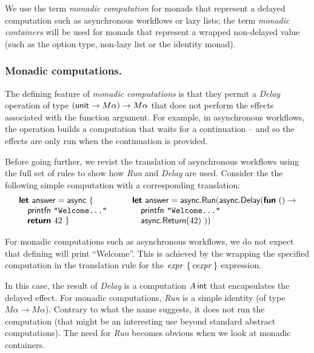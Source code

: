 \documentclass[runningheads,a4paper]{llncs}
\begin{document}
We use the term \emph{monadic computation} for monads that represent 
a delayed computation such as asynchronous workflows or lazy lists; the term 
\emph{monadic containers} will be used for monads that represent a wrapped non-delayed value
(such as the option type, non-lazy list or the identity monad).

\vspace{-1em}
\subsubsection{Monadic computations.} The defining feature of \emph{monadic computations}
is that they permit a \emph{Delay} operation of type $(\textnormal{\sffamily unit} \rightarrow M\alpha) \rightarrow M\alpha$
that does not perform the effects associated with the function argument.
For example, in asynchronous workflows, the operation builds 
a computation that waits for a continuation -- and so the effects are only run when the continuation
is provided.

Before going further, we revist the translation of asynchronous workflows using the full set of
rules to show how \emph{Run} and \emph{Delay} are used. Consider the the following simple computation
with a corresponding translation:
%
\begin{equation*}
\begin{array}{l}
\kvd{let}~\ident{answer} = \ident{async}~\{\\
\quad \ident{printfn}~ \texttt{"Welcome..."}\\
\quad \kvd{return}~ 42 ~\}
\end{array}
\qquad
\begin{array}{l}
\kvd{let}~\ident{answer} = \ident{async}.\ident{Run}(\ident{async}.\ident{Delay}(\kvd{fun}~()\rightarrow\\
\quad \ident{printfn}~ \texttt{"Welcome..."}\\
\quad \ident{async}.\ident{Return}(42)~))
\end{array}
\end{equation*}

For monadic computations such as asynchronous workflows, we do not expect that defining
 will print ``Welcome''. This is achieved by the wrapping the specified computation in the 
translation rule for the $\textnormal{\emph{expr}}~\{\,\textnormal{\emph{cexpr}}\,\}$ expression. 

In this case, the result of \emph{Delay} is a computation $A\,\textnormal{\sffamily int}$ that encapsulates the
delayed effect. For monadic computations, \emph{Run} is a simple identity (of type $M \alpha \rightarrow M \alpha$).
Contrary to what the name suggests, it does not run the computation (that might be an interesting
use beyond standard abstract computations). The need for \emph{Run} becomes obvious when we look
at monadic containers.
\end{document}
